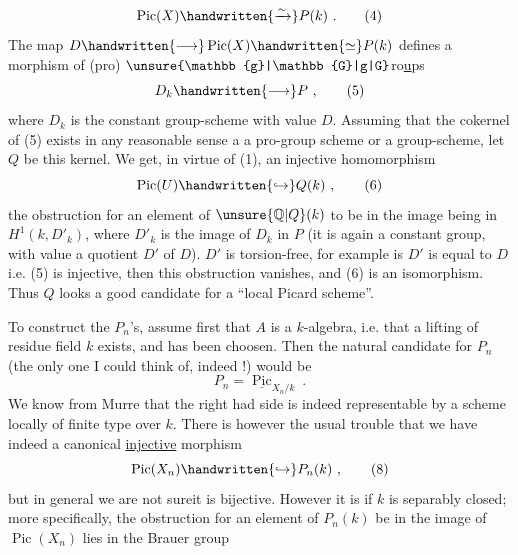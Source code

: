 \[
\operatorname{Pic}(X)\handwritten{\xrightarrow{\sim}}P(k)\ .
\tag*{(4)}
\]
The map $D\handwritten{\longrightarrow}\operatorname{Pic}(X)\handwritten{\simeq}P(k)$ defines a morphism of (pro) $\unsure{\mathbb{g}|\mathbb{G}|g|G}$ro\uline{u}ps
\[
D_k\handwritten{\longrightarrow}P\ ,
\tag*{(5)}
\]
where $D_k$ is the constant group-scheme with value $D$. Assuming that the cokernel of (5) exists in any reasonable sense a a pro-group scheme or a group-scheme, let $Q$ be this kernel. We get, in virtue of (1), an injective homomorphism
\[
\operatorname{Pic}(U)\handwritten{\hookrightarrow}Q(k)\ ,
\tag*{(6)}
\]
the obstruction for an element of $\unsure{\mathbb{Q}|Q}(k)$ to be in the image being in $H^1(k,D'_k)$, where $D'_k$ is the image of $D_k$ in $P$ (it is again a constant group, with value a quotient $D'$ of $D$).   $D'$ is torsion-free, for example is $D'$ is equal to $D$ i.e. (5) is injective, then this obstruction vanishes, and  (6) is an isomorphism. Thus $Q$ looks a good candidate for a ``local Picard scheme''.

To construct the $P_n$'s, assume first that $A$ is a $k$-algebra, i.e. that a lifting of   residue field $k$ exists, and has been choosen. Then the natural candidate for $P_n$ (the only one I could think of, indeed !) would be
\[
P_n=\underline{\operatorname{Pic}}_{X_n/k}\ .
\tag*{(7)}
\]
We know from Murre that the right had side is indeed representable by a scheme locally of finite type over $k$. There is however the usual trouble that we have indeed a canonical \uline{injective} morphism
\[
\operatorname{Pic}(X_n)\handwritten{\hookrightarrow}P_n(k)\ ,
\tag*{(8)}
\]
but in general we are not sureit is bijective. However it is if $k$ is separably closed; more specifically, the obstruction for an element of $P_n(k)$  be in the image of $\operatorname{Pic}(X_n)$ lies in the Brauer group  
